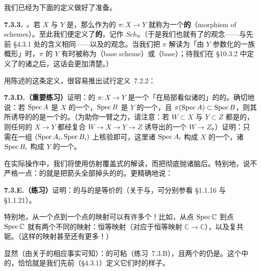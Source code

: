 我们已经为下面的定义做好了准备。

\textbf{7.3.3.}\ \emph{\trhDefinition{}。}\quad 若 $X$ 与 $Y$ 是\trScheme，那么作为\trLocallyRingedSpace{}的\trMorphism{} $\pi\colon X\to Y$ 就称为一个\textbf{\trScheme{}的\trMorphism}（morphism of schemes）。至此我们便定义了\textbf{\trScheme{}的\trCategory}，记作 $\mathit{Sch}$。（于是我们也就有了\trIsomorphism{}的观念——与先前 \S4.3.1 处的含义相同——以及\trAutomorphism{}的观念。当我们把 $\pi$ 解读为「由 $Y$ 参数化的一族概形」时，$\pi$ 的\emph{\trTarget} $Y$ 有时被称为\textbf{\trBase\trScheme}（base scheme）或\textbf{\trBase}（base）；待我们在 \S10.3.2 中定义了\trMorphism{}的诸\trFiber{}之后，这话会更加清楚。）

用\trLocallyRingedSpace{}陈述的这条定义，很容易推出试行定义~7.2.2：

\textbf{7.3.D.（重要练习）}\quad 证明：\trScheme{}的\trMorphism{} $\pi\colon X\to Y$ 是一个「在局部看似诸\trAffineScheme{}的\trMorphism」的\trRingedSpace{}的\trMorphism。确切地说：若 $\operatorname{Spec} A$ 是 $X$ 的一个\trAffine\trOpenSubset，$\operatorname{Spec} B$ 是 $Y$ 的一个\trAffine\trOpenSubset，且 $\pi(\operatorname{Spec} A)\subset\operatorname{Spec} B$，则其所诱导的\trRingedSpace{}的\trMorphism{}是一个\trAffineScheme{}的\trMorphism。（为助你一臂之力，请注意：若 $W\subset X$ 与 $Y\subset Z$ 都是\trRingedSpace{}的\trOpenEmbedding，则任何\trRingedSpace{}的\trMorphism{} $X\to Y$ 都经复合 $W\to X\to Y\to Z$ 诱导出\trRingedSpace{}的一个\trMorphism{} $W\to Z$。）证明：只需在一组 $(\operatorname{Spec} A_i,\operatorname{Spec} B_i)$ 上核验即可，这里诸 $\operatorname{Spec} A_i$ 构成 $X$ 的一个\trOpenCover，诸 $\operatorname{Spec} B_i$ 构成 $Y$ 的一个\trOpenCover。

在实际操作中，我们将使用仿射覆盖式的解读，而把\trLocallyRingedSpace{}彻底抛诸脑后。特别地，说不严格一点：\trAffineScheme{}的\trCategory{}就是把箭头全部掉头的\trRing{}的\trCategory。更精确地说：

\textbf{7.3.E.（练习）}\quad 证明：\trRing{}的\trCategory{}与\trAffineScheme{}的\trOppositeCategory{}是等价的（关于\trOppositeCategory{}与\trEquivalenceOfCategories，可分别参看 \S1.1.16 与 \S1.1.21）。

特别地，从一个点到一个点的映射可以有许多个！比如，从点 $\operatorname{Spec}\mathbb{C}$ 到点 $\operatorname{Spec}\mathbb{C}$ 就有两个不同的映射：恒等映射（对应于恒等映射 $\mathbb{C}\to\mathbb{C}$），以及复共轭。（这样的映射甚至还有更多！）

显然（由关于\trLocallyRingedSpace{}的相应事实可知）：\trScheme{}的\trMorphism{}可粘（练习~7.3.B），且两个\trMorphism{}的\trComposition{}仍是\trMorphism。这个\trCategory{}中的\trIsomorphism{}，恰恰就是我们先前（\S4.3.1）定义它们时的样子。

